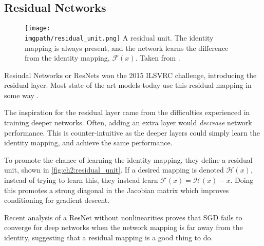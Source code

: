 \subsection{Residual Networks}\label{sec:ch2:resnets}
  \begin{figure}[tb]
    \centering
    \texttt{[image: \\imgpath/residual\_unit.png]}
          {A residual unit. The identity mapping is always present, and the
            network learns the difference from the identity mapping, $\mathcal{F}(x)$.
            Taken from \cite{he_deep_2016}.}
      \label{fig:ch2:residual_unit}
  \end{figure}
  Resiudal Networks or ResNets won the 2015 ILSVRC challenge, introducing the
  residual layer. Most state of the art models today use this residual mapping
  in some way \cite{zagoruyko_wide_2016-1, xie_aggregated_2017}.

  The inspiration for the residual layer came from the difficulties
  experienced in training deeper networks. Often, adding an extra layer would
  \emph{decrease} network performance. This is counter-intuitive as the deeper
  layers could simply learn the identity mapping, and achieve the same
  performance.

  To promote the chance of learning the identity mapping, they define a residual
  unit, shown in \autoref{fig:ch2:residual_unit}. If a desired mapping is
  denoted $\mathcal{H}(x)$, instead of trying to learn this, they instead learn
  $\mathcal{F}(x) = \mathcal{H}(x) - x$. Doing this promotes a strong diagonal
  in the Jacobian matrix which improves conditioning for gradient descent.

  Recent analysis of a ResNet without nonlinearities
  \cite{bartlett_representing_2018, bartlett_gradient_2018} proves that SGD
  fails to converge for deep networks when the network mapping is far away from
  the identity, suggesting that a residual mapping is a good thing to do.
